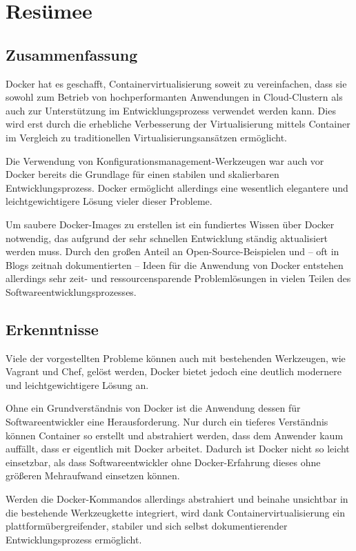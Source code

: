 \chapter{Resümee}
\section{Zusammenfassung}
Docker hat es geschafft, Containervirtualisierung soweit zu vereinfachen, dass sie sowohl zum Betrieb von hochperformanten Anwendungen in Cloud-Clustern als auch zur Unterstützung im Entwicklungsprozess verwendet werden kann.
Dies wird erst durch die erhebliche Verbesserung der Virtualisierung mittels Container im Vergleich zu traditionellen Virtualisierungsansätzen ermöglicht.

Die Verwendung von Konfigurationsmanagement-Werkzeugen war auch vor Docker bereits die Grundlage für einen stabilen und skalierbaren Entwicklungsprozess.
Docker ermöglicht allerdings eine wesentlich elegantere und leichtgewichtigere Lösung vieler dieser Probleme.

Um saubere Docker-Images zu erstellen ist ein fundiertes Wissen über Docker notwendig, das aufgrund der sehr schnellen Entwicklung ständig aktualisiert werden muss.
Durch den großen Anteil an Open-Source-Beispielen und -- oft in Blogs zeitnah dokumentierten -- Ideen für die Anwendung von Docker entstehen allerdings sehr zeit- und ressourcensparende Problemlösungen in vielen Teilen des Softwareentwicklungsprozesses.

\section{Erkenntnisse}
Viele der vorgestellten Probleme können auch mit bestehenden Werkzeugen, wie \zB Vagrant und Chef, gelöst werden, Docker bietet jedoch eine deutlich modernere und leichtgewichtigere Lösung an.

Ohne ein Grundverständnis von Docker ist die Anwendung dessen für Softwareentwickler eine Herausforderung.
Nur durch ein tieferes Verständnis können Container so erstellt und abstrahiert werden, dass dem Anwender kaum auffällt, dass er eigentlich mit Docker arbeitet.
Dadurch ist Docker nicht so leicht einsetzbar, als dass Softwareentwickler ohne Docker-Erfahrung dieses ohne größeren Mehraufwand einsetzen können.

Werden die Docker-Kommandos allerdings abstrahiert und beinahe unsichtbar in die bestehende Werkzeugkette integriert, wird dank Containervirtualisierung ein plattformübergreifender, stabiler und sich selbst dokumentierender Entwicklungsprozess ermöglicht.


